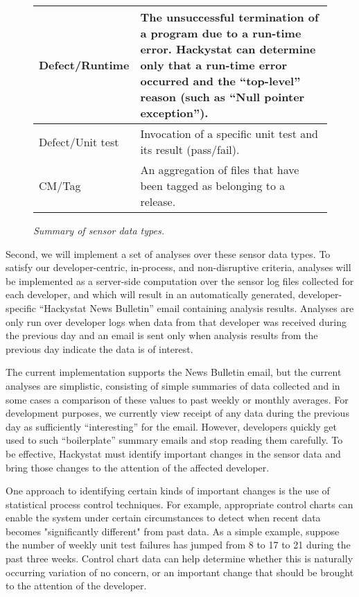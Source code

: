 \begin{figure*}[t]
\begin{small}
\begin{center}
\begin{tabular}{|l|p{5in}|}
\\ \hline
Defect/Runtime
& The unsuccessful termination of a program due to a run-time
error. Hackystat can determine only that a run-time error occurred and the
``top-level'' reason (such as ``Null pointer exception''). 
\\ \hline
Defect/Unit test
& Invocation of a specific unit test and its result (pass/fail). 
\\ \hline
CM/Tag
& An aggregation of files that have been tagged as belonging to a release.
\\ \hline
\end{tabular} 
\end{center}
\end{small}
\caption{{\em Summary of sensor data types.}}
\label{fig:sensors}
\end{figure*}


Second, we will implement a set of analyses over these sensor data types.
To satisfy our developer-centric, in-process, and non-disruptive criteria,
analyses will be implemented as a server-side computation over the sensor
log files collected for each developer, and which will result in an
automatically generated, developer-specific ``Hackystat News Bulletin''
email containing analysis results. Analyses are only run over developer
logs when data from that developer was received during the previous day and
an email is sent only when analysis results from the previous day indicate
the data is of interest.

The current implementation supports the News Bulletin email, but the
current analyses are simplistic, consisting of simple summaries of data
collected and in some cases a comparison of these values to past weekly or
monthly averages. For development purposes, we currently view receipt of
any data during the previous day as sufficiently ``interesting'' for the
email.  However, developers quickly get used to such ``boilerplate''
summary emails and stop reading them carefully.  To be effective, Hackystat
must identify important changes in the sensor data and bring those changes
to the attention of the affected developer.

One approach to identifying certain kinds of important changes is the
use of statistical process control techniques. For example, appropriate
control charts can enable the system under certain circumstances to detect
when recent data becomes "significantly different" from past data.  As a
simple example, suppose the number of weekly unit test failures has jumped
from 8 to 17 to 21 during the past three weeks. Control chart data can help
determine whether this is naturally occurring variation of no concern, or
an important change that should be brought to the attention of the
developer.

